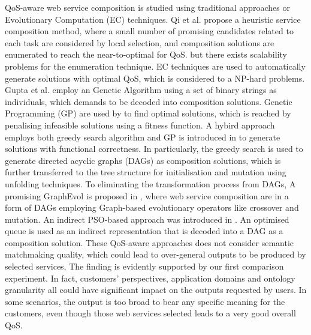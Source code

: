 \documentclass{llncs}
\begin{document}
QoS-aware web service composition is studied using traditional approaches or Evolutionary Computation (EC) techniques. Qi et al. \cite{qi2010combining} propose a heuristic service composition method, where a small number of promising candidates related to each task are considered by local selection, and composition solutions are enumerated to reach the near-to-optimal for QoS. but there exists scalability problems for the enumeration technique. EC techniques are used to automatically generate solutions with optimal QoS, which is considered to a NP-hard problems. Gupta et al. \cite{gupta2015optimization} employ an Genetic Algorithm using a set of binary strings as individuals, which demands to be decoded into composition solutions. Genetic Programming (GP) are used by \cite{yu2013adaptive} to find optimal solutions, which is reached by penalising infeasible solutions using a fitness function. A hybird approach employs both greedy search algorithm and GP is introduced in \cite{ma2015hybrid} to generate solutions with functional correctness. In particularly, the greedy search is used to generate  directed acyclic graphs (DAGs) as composition solutions, which is further transferred to the tree structure for initialisation and mutation using unfolding techniques. To eliminating the transformation process from DAGs, A promising GraphEvol is proposed in \cite{da2015graphevol}, where web service composition are in a form of DAGs employing Graph-based evolutionary operators like crossover and mutation. An indirect PSO-based approach was introduced in \cite{da2016particle}. An optimised queue is used as an indirect representation that is decoded into a DAG as a composition solution. These QoS-aware approaches does not consider semantic matchmaking quality, which could lead to over-general outputs to be produced by selected services, The finding is evidently supported by our first comparison experiment. In fact, customers' perspectives, application domains and ontology granularity all could have significant impact on the outputs requested by users. In some scenarios, the output is too broad to bear any specific meaning for the customers, even though those web services selected leads to a very good overall QoS.
\end{document}
